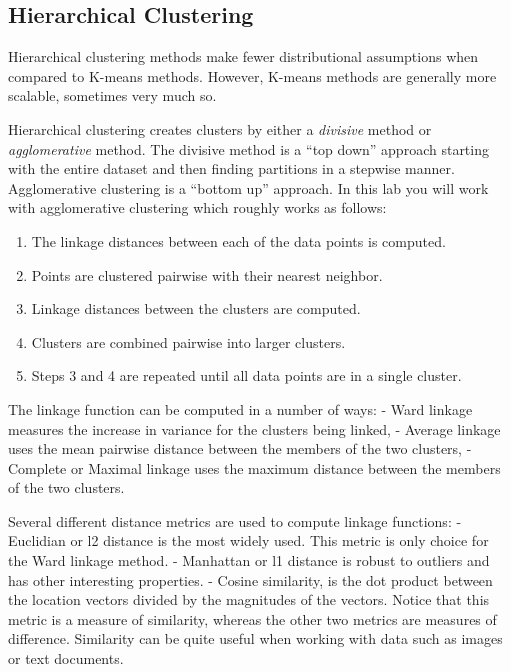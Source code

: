\documentclass[11pt]{article}
\providecommand{\tightlist}{%
      \setlength{\itemsep}{0pt}\setlength{\parskip}{0pt}}
\begin{document}
    \hypertarget{hierarchical-clustering}{%
\subsection{Hierarchical Clustering}\label{hierarchical-clustering}}

Hierarchical clustering methods make fewer distributional assumptions
when compared to K-means methods. However, K-means methods are generally
more scalable, sometimes very much so.

Hierarchical clustering creates clusters by either a \emph{divisive}
method or \emph{agglomerative} method. The divisive method is a ``top
down'' approach starting with the entire dataset and then finding
partitions in a stepwise manner. Agglomerative clustering is a ``bottom
up'' approach. In this lab you will work with agglomerative clustering
which roughly works as follows:

\begin{enumerate}
\def\labelenumi{\arabic{enumi}.}
\tightlist
\item
  The linkage distances between each of the data points is computed.
\item
  Points are clustered pairwise with their nearest neighbor.
\item
  Linkage distances between the clusters are computed.
\item
  Clusters are combined pairwise into larger clusters.
\item
  Steps 3 and 4 are repeated until all data points are in a single
  cluster.
\end{enumerate}

The linkage function can be computed in a number of ways: - Ward linkage
measures the increase in variance for the clusters being linked, -
Average linkage uses the mean pairwise distance between the members of
the two clusters, - Complete or Maximal linkage uses the maximum
distance between the members of the two clusters.

Several different distance metrics are used to compute linkage
functions: - Euclidian or l2 distance is the most widely used. This
metric is only choice for the Ward linkage method. - Manhattan or l1
distance is robust to outliers and has other interesting properties. -
Cosine similarity, is the dot product between the location vectors
divided by the magnitudes of the vectors. Notice that this metric is a
measure of similarity, whereas the other two metrics are measures of
difference. Similarity can be quite useful when working with data such
as images or text documents.
\end{document}
